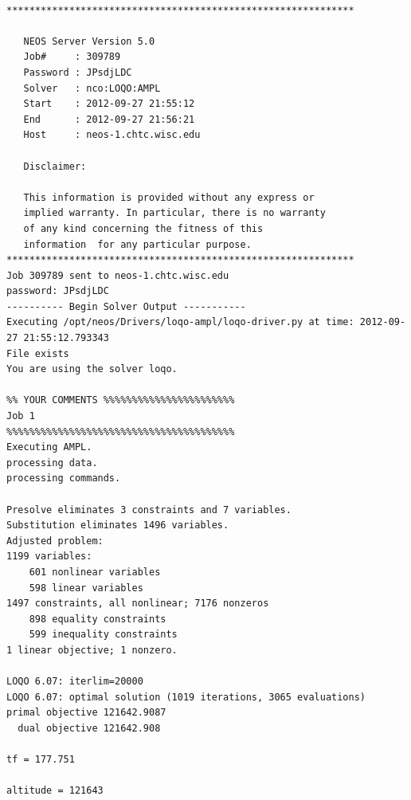 \documentclass{article}
\begin{document}
\scriptsize
\begin{verbatim}

*************************************************************

   NEOS Server Version 5.0
   Job#     : 309789
   Password : JPsdjLDC
   Solver   : nco:LOQO:AMPL
   Start    : 2012-09-27 21:55:12
   End      : 2012-09-27 21:56:21
   Host     : neos-1.chtc.wisc.edu

   Disclaimer:

   This information is provided without any express or
   implied warranty. In particular, there is no warranty
   of any kind concerning the fitness of this
   information  for any particular purpose.
*************************************************************
Job 309789 sent to neos-1.chtc.wisc.edu
password: JPsdjLDC
---------- Begin Solver Output -----------
Executing /opt/neos/Drivers/loqo-ampl/loqo-driver.py at time: 2012-09-27 21:55:12.793343
File exists
You are using the solver loqo.

%% YOUR COMMENTS %%%%%%%%%%%%%%%%%%%%%%%
Job 1
%%%%%%%%%%%%%%%%%%%%%%%%%%%%%%%%%%%%%%%%
Executing AMPL.
processing data.
processing commands.

Presolve eliminates 3 constraints and 7 variables.
Substitution eliminates 1496 variables.
Adjusted problem:
1199 variables:
	601 nonlinear variables
	598 linear variables
1497 constraints, all nonlinear; 7176 nonzeros
	898 equality constraints
	599 inequality constraints
1 linear objective; 1 nonzero.

LOQO 6.07: iterlim=20000
LOQO 6.07: optimal solution (1019 iterations, 3065 evaluations)
primal objective 121642.9087
  dual objective 121642.908

tf = 177.751

altitude = 121643


\end{verbatim}
\end{document}
